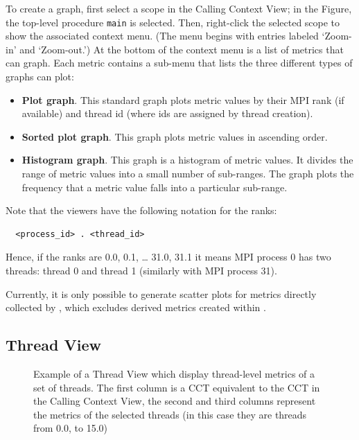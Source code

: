 To create a graph, first select a scope in the Calling Context View; in the Figure, the top-level procedure \texttt{main} is selected.
Then, right-click the selected scope to show the associated context menu.
(The menu begins with entries labeled `Zoom-in' and `Zoom-out.')
At the bottom of the context menu is a list of metrics that \hpcviewer{} can graph.
Each metric contains a sub-menu that lists the three different types of graphs \hpcviewer{} can plot:
\begin{itemize}
\item \textbf{Plot graph}.
  This standard graph plots metric values by their MPI rank (if available) and thread id (where ids are assigned by thread creation).

\item \textbf{Sorted plot graph}.
  This graph plots metric values in ascending order.

\item \textbf{Histogram graph}.
  This graph is a histogram of metric values.
  It divides the range of metric values into a small number of sub-ranges.
  The graph plots the frequency that a metric value falls into a particular sub-range.
\end{itemize}

Note that the viewers have the following notation for the ranks:
\begin{verbatim}
  <process_id> . <thread_id>
\end{verbatim}
Hence, if the ranks are 0.0, 0.1, \dots{} 31.0, 31.1 it means MPI process 0 has two threads: thread 0 and thread 1 (similarly with MPI process 31). 


Currently, it is only possible to generate scatter plots for metrics directly collected by \hpcrun{}, which excludes derived metrics created within \hpcviewer{}.


\subsection{Thread View}
\label{sec:thread-level-table}

\begin{figure}[t]
\caption{Example of a Thread View which display thread-level metrics of a set of threads. The first column is a CCT equivalent to the CCT in the Calling Context View, the second and third columns represent the metrics of the selected threads (in this case they are threads from 0.0, to 15.0)}
\label{fig:hpcviewer-view-thread-level}
\end{figure}

